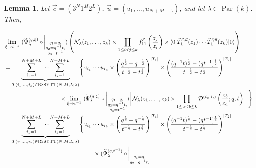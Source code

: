 \documentclass[12pt,reqno,a4paper]{amsart}
\newcommand{\comp}{\circ}
\newcommand{\cals}[1]{\mathcal{#1}}
\numberwithin{equation}{section}
\newtheorem{lem}[thm]{Lemma}
\newcommand{\dualmap}{
\widetilde{\Psi}^{(q,\xi)}_{\lambda}
}
\theoremstyle{definition}
\begin{document}
\begin{lem}
\label{lemm42-1252-25jul}
Let $\vec{c} = (3^N1^M2^L)$, $\vec{u} = (u_1,\dots,u_{N+M+L})$, and let $\lambda \in \operatorname{Par}(k)$. Then, 

\footnotesize
\begin{align}
	&
	\lim_{\xi \rightarrow t^{-1}}\,\,
	(
	\dualmap
	\comp 
	\bigg|_{
		\substack{
			q_1 = q, \\
			q_2 = q^{-1}t,\\
			q_3 = t^{-1} \\
		}
	}
	)
	\left(
	\cals{N}_{\lambda}(z_1,\dots,z_k )
	\times
	\prod_{1 \leq i < j \leq k}f^{\vec{c}}_{11}\left(\frac{z_j}{z_i} \right)
	\times
	\langle 0 |\widetilde{T}^{\vec{c},\vec{u}}_{1}(z_1 )\cdots \widetilde{T}^{\vec{c},\vec{u}}_{1}(z_k )|0\rangle
	\right)
	\\
	&= 
	\underbrace{				
		\sum_{i_1 = 1}^{N+M+L}
		\cdots
		\sum_{i_k = 1}^{N+M+L}
	}_{
		T(i_1,\dots,i_k) \in 
		\operatorname{RSSYTT}(N,M,L;\lambda)
	}
	\Biggl\{
	u_{i_1}\cdots u_{i_k}
	\times
	\left(
	\frac{
		q^{\frac{1}{2}} - q^{-\frac{1}{2}}
	}{
		t^{-\frac{1}{2}} - t^{\frac{1}{2}}
	}
	\right)^{|T_1|}
	\times
	\left(
	\frac{
		(q^{-1}t)^{\frac{1}{2}} - (qt^{-1})^{\frac{1}{2}}
	}{
		t^{-\frac{1}{2}} - t^{\frac{1}{2}}
	}
	\right)^{|T_2|}
	\notag 
	\\
	&\hspace{3.3cm}\times
	\lim_{\xi \rightarrow t^{-1}}\,\,
	(
	\dualmap
	\comp 
	\bigg|_{
		\substack{
			q_1 = q, \\
			q_2 = q^{-1}t,\\
			q_3 = t^{-1} \\
		}
	}
	)
	\bigg[
	\cals{N}_\lambda(z_1,\dots,z_k)
	\times
	\prod_{1 \leq a < b \leq k}
	\cals{D}^{(i_a,i_b)}\left(
	\frac{z_b}{z_a}
	; q, t
	\right)
	\bigg]
	\Biggr\}
	\notag 
	\\
	&= 
	\underbrace{				
		\sum_{i_1 = 1}^{N+M+L}
		\cdots
		\sum_{i_k = 1}^{N+M+L}
	}_{
		T(i_1,\dots,i_k) \in 
		\operatorname{RSSYTT}(N,M,L;\lambda)
	}
	\Biggl\{
	u_{i_1}\cdots u_{i_k}
	\times
	\left(
	\frac{
		q^{\frac{1}{2}} - q^{-\frac{1}{2}}
	}{
		t^{-\frac{1}{2}} - t^{\frac{1}{2}}
	}
	\right)^{|T_1|}
	\times
	\left(
	\frac{
		(q^{-1}t)^{\frac{1}{2}} - (qt^{-1})^{\frac{1}{2}}
	}{
		t^{-\frac{1}{2}} - t^{\frac{1}{2}}
	}
	\right)^{|T_2|}
	\notag 
	\\
	&\hspace{5.3cm}\times
	(
	\widetilde{\Psi}_{\lambda}^{(q,t^{-1})}
	\comp 
	\bigg|_{
		\substack{
			q_1 = q, \\
			q_2 = q^{-1}t,\\
}}
\end{align}
\end{lem}
\end{document}
